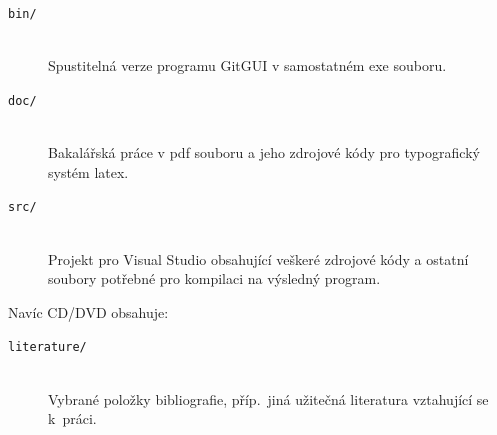 \documentclass[
  biblatex,
  glossaries,
  index
]{kidiplom}
\begin{document}
\begin{description}

\item[\texttt{bin/}] \hfill \\
  Spustitelná verze programu GitGUI v samostatném exe souboru.
  
\item[\texttt{doc/}] \hfill \\
  Bakalářská práce v pdf souboru a jeho zdrojové kódy pro typografický systém latex.
  
\item[\texttt{src/}] \hfill \\
Projekt pro Visual Studio obsahující veškeré zdrojové kódy a ostatní soubory potřebné pro kompilaci na výsledný program.

\end{description}

Navíc CD/DVD obsahuje:

\begin{description}

\item[\texttt{literature/}] \hfill \\
  Vybrané položky bibliografie, příp.~jiná užitečná literatura
  vztahující se k~práci.

\end{description}


\printglossary


\nocite{*}
\printbibliography

%
%

\printindex
\end{document}
